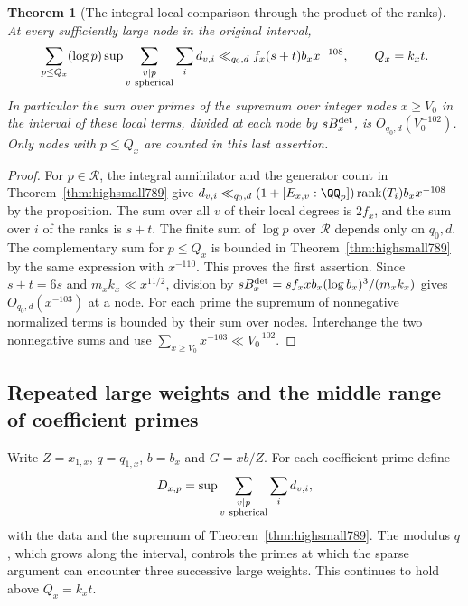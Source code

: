 \documentclass[a4paper,11pt]{article}
\newtheorem{theorem}[proposition]{Theorem}
\theoremstyle{definition}
\theoremstyle{remark}
\numberwithin{equation}{section}
\begin{document}
\begin{theorem}[The integral local comparison through the product of the ranks]
\leavevmode\label{thm:highallsmall790}
At every sufficiently large node in the original interval,
\[
 \sum_{p\le Q_x}(\log p)\sup
       \sum_{\substack{v\mid p\\v\ {\rm spherical}}}\sum_i d_{v,i}
              \ll_{q_0,d} f_x(s+t)b_x x^{-108},
 \qquad Q_x=k_xt .
\]
In particular the sum over primes of the supremum over
integer nodes \(x\ge V_0\) in the interval of these local
terms, divided at each node by \(s B_x^{\rm det}\), is
\(O_{q_0,d}(V_0^{-102})\). Only nodes with \(p\le Q_x\)
are counted in this last assertion.
\end{theorem}
\begin{proof}
For \(p\in\mathcal R\), the integral annihilator and the
generator count in Theorem~\ref{thm:highsmall789} give
\(d_{v,i}\ll_{q_0,d}(1+[E_{x,v}:\QQ_p])\operatorname{rank}(T_i)
b_x x^{-108}\) by the proposition. The sum over all \(v\)
of their local degrees is \(2f_x\), and the sum over \(i\)
of the ranks is \(s+t\). The finite sum of \(\log p\) over
\(\mathcal R\) depends only on \(q_0,d\). The complementary
sum for \(p\le Q_x\) is bounded in
Theorem~\ref{thm:highsmall789} by the same expression with
\(x^{-110}\). This proves the first assertion.
Since \(s+t=6s\) and \(m_x k_x\ll x^{11/2}\), division by
\(sB_x^{\rm det}=s f_x x b_x(\log b_x)^3/(m_xk_x)\)
gives \(O_{q_0,d}(x^{-103})\) at a node. For each prime
the supremum of nonnegative normalized terms is bounded
by their sum over nodes. Interchange the two nonnegative
sums and use \(\sum_{x\ge V_0}x^{-103}\ll V_0^{-102}\).
\end{proof}
\clearpage

\subsection{Repeated large weights and the middle range of coefficient primes}
\label{sec:highmiddle791}
Write \(Z=x_{1,x}\), \(q=q_{1,x}\), \(b=b_x\) and \(G=xb/Z\).
For each coefficient prime define
\[
 D_{x,p}=\sup\sum_{\substack{v\mid p\\v\ {\rm spherical}}}
                         \sum_i d_{v,i},
\]
with the data and the supremum of Theorem~\ref{thm:highsmall789}.
The modulus \(q\), which grows along the interval, controls the
primes at which the sparse argument can encounter three successive
large weights. This continues to hold above \(Q_x=k_xt\).
\end{document}
